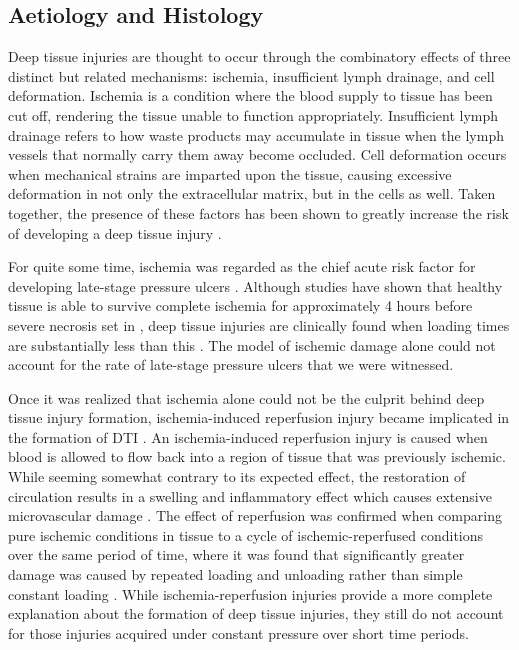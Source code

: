 		\subsection{Aetiology and Histology}
			\label{sec:litreview-aetiology}
			Deep tissue injuries are thought to occur through the combinatory effects of three distinct but related mechanisms: ischemia, insufficient lymph drainage, and cell deformation. Ischemia is a condition where the blood supply to tissue has been cut off, rendering the tissue unable to function appropriately. Insufficient lymph drainage refers to how waste products may accumulate in tissue when the lymph vessels that normally carry them away become occluded. Cell deformation occurs when mechanical strains are imparted upon the tissue, causing excessive deformation in not only the extracellular matrix, but in the cells as well. Taken together, the presence of these factors has been shown to greatly increase the risk of developing a deep tissue injury \cite{stekelenburg08}.

			For quite some time, ischemia was regarded as the chief acute risk factor for developing late-stage pressure ulcers \cite{witkowski82,dinsdale74,kosiak61}. Although studies have shown that healthy tissue is able to survive complete ischemia for approximately 4 hours before severe necrosis set in \cite{labbe87,strock69}, deep tissue injuries are clinically found when loading times are substantially less than this \cite{aronovitch99,bliss99}. The model of ischemic damage alone could not account for the rate of late-stage pressure ulcers that we were witnessed.

			Once it was realized that ischemia alone could not be the culprit behind deep tissue injury formation, ischemia-induced reperfusion injury became implicated in the formation of DTI \cite{Ytrehus95,Blaisdell02,tsuji05}. An ischemia-induced reperfusion injury is caused when blood is allowed to flow back into a region of tissue that was previously ischemic. While seeming somewhat contrary to its expected effect, the restoration of circulation results in a swelling and inflammatory effect which causes extensive microvascular damage \cite{Blaisdell02}. The effect of reperfusion was confirmed when comparing pure ischemic conditions in tissue to a cycle of ischemic-reperfused conditions over the same period of time, where it was found that significantly greater damage was caused by repeated loading and unloading rather than simple constant loading \cite{tsuji05,salcido94}. While ischemia-reperfusion injuries provide a more complete explanation about the formation of deep tissue injuries, they still do not account for those injuries acquired under constant pressure over short time periods.

